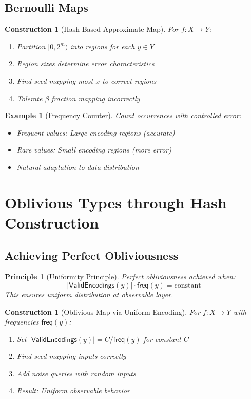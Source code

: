 \documentclass[11pt,final,hidelinks]{article}
\newtheorem{example}[theorem]{Example}
\newtheorem{construction}[theorem]{Construction}
\newtheorem{principle}[theorem]{Principle}
\newcommand{\ValidEnc}[1]{\mathsf{ValidEncodings}(#1)}
\newcommand{\Card}[1]{|#1|}
\newcommand{\fnrate}{\beta}
\newcommand{\Freq}[1]{\mathsf{freq}(#1)}
\begin{document}
\subsection{Bernoulli Maps}

\begin{construction}[Hash-Based Approximate Map]
For $f: X \to Y$:
\begin{enumerate}
    \item Partition $[0, 2^m)$ into regions for each $y \in Y$
    \item Region sizes determine error characteristics
    \item Find seed mapping most $x$ to correct regions
    \item Tolerate $\fnrate$ fraction mapping incorrectly
\end{enumerate}
\end{construction}

\begin{example}[Frequency Counter]
Count occurrences with controlled error:
\begin{itemize}
    \item Frequent values: Large encoding regions (accurate)
    \item Rare values: Small encoding regions (more error)
    \item Natural adaptation to data distribution
\end{itemize}
\end{example}

\section{Oblivious Types through Hash Construction}

\subsection{Achieving Perfect Obliviousness}

\begin{principle}[Uniformity Principle]
Perfect obliviousness achieved when:
\begin{equation}
\Card{\ValidEnc{y}} \cdot \Freq{y} = \text{constant}
\end{equation}
This ensures uniform distribution at observable layer.
\end{principle}

\begin{construction}[Oblivious Map via Uniform Encoding]
For $f: X \to Y$ with frequencies $\Freq{y}$:
\begin{enumerate}
    \item Set $\Card{\ValidEnc{y}} = C/\Freq{y}$ for constant $C$
    \item Find seed mapping inputs correctly
    \item Add noise queries with random inputs
    \item Result: Uniform observable behavior
\end{enumerate}
\end{construction}
\end{document}
